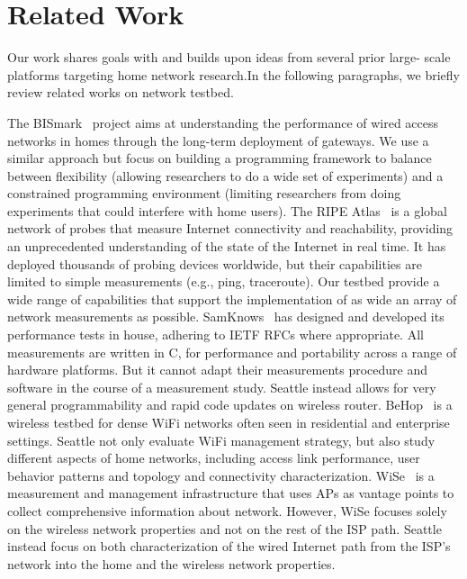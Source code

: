 \section{Related Work}
\label{sec.related_work}
Our work shares goals with and builds upon ideas from several prior large-
scale platforms targeting home network research.In the following paragraphs, 
we briefly review related works on network testbed. 

The BISmark~\cite{183951} project aims at understanding the performance of 
wired access networks in homes through the long-term deployment of gateways. 
We use a similar approach but focus on building a programming framework to 
balance between flexibility (allowing researchers to do a wide set of 
experiments) and a constrained programming environment (limiting researchers 
from doing experiments that could interfere with home users). The RIPE Atlas~\cite{ripeatlas} is a global network of probes that measure Internet 
connectivity and reachability, providing an unprecedented understanding of 
the state of the Internet in real time. It has deployed thousands of probing 
devices worldwide, but their capabilities are limited to simple measurements 
(e.g., ping, traceroute). Our testbed provide a wide range of capabilities 
that support the implementation of as wide an array of network measurements 
as possible. SamKnows~\cite{samknows} has designed and developed its 
performance tests in house, adhering to IETF RFCs where appropriate. All 
measurements are written in C, for performance and portability across a 
range of hardware platforms. But it cannot adapt their measurements 
procedure and software in the course of a measurement study. Seattle instead 
allows for very general programmability and rapid code updates on wireless 
router. BeHop~\cite{yiakoumis2014behop} is a wireless testbed for dense WiFi 
networks often seen in residential and enterprise settings. Seattle not only 
evaluate WiFi management strategy, but also study different aspects of home 
networks, including access link performance, user behavior patterns and 
topology and connectivity characterization. WiSe~\cite{patro2013observing} 
is a measurement and management infrastructure that uses APs as vantage 
points to collect comprehensive information about network. However, WiSe 
focuses solely on the wireless network properties and not on the rest of the 
ISP path. Seattle instead focus on both characterization of the wired 
Internet path from the ISP’s network into the home and the wireless network 
properties.

